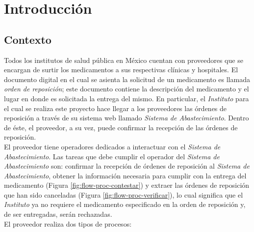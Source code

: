 \chapter{Introducción}\label{cap1}
\section{Contexto} \label{sec:intro-contexto}
Todos los institutos de salud pública en México cuentan con proveedores que se encargan de surtir los medicamentos a sus respectivas clínicas y hospitales. El documento digital en el cual se asienta la solicitud de un medicamento es llamada \textit{orden de reposición}; este documento contiene la descripción del medicamento y el lugar en donde es solicitada la entrega del mismo. En particular, el \textit{Instituto} para el cual se realiza este proyecto hace llegar a los proveedores las órdenes de reposición a través de su sistema web llamado \textit{Sistema de Abastecimiento}. Dentro de éste, el proveedor, a su vez, puede confirmar la recepción de las órdenes de reposición.\\
El proveedor tiene operadores dedicados a interactuar con el \textit{Sistema de Abastecimiento}. Las tareas que debe cumplir el operador del \textit{Sistema de Abastecimiento} son: confirmar la recepción de órdenes de reposición al \textit{Sistema de Abastecimiento}, obtener la información necesaria para cumplir con la entrega del medicamento (Figura \ref{fig:flow-proc-contestar}) y extraer las órdenes de reposición que han sido canceladas (Figura \ref{fig:flow-proc-verificar}), lo cual significa que el \textit{Instituto} ya no requiere el medicamento especificado en la orden de reposición y, de ser entregadas, serán rechazadas.\\
El proveedor realiza dos tipos de procesos:

